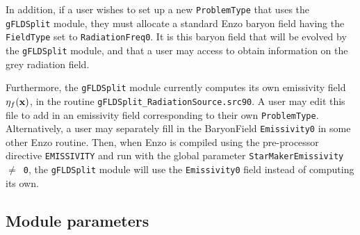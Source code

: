 \documentclass[letterpaper,10pt]{article}
\renewcommand{\(}{\left(}
\renewcommand{\)}{\right)}
\newcommand{\xvec}{{\bf x}}
\begin{document}
In addition, if a user wishes to set up a new {\tt ProblemType} that
uses the {\tt gFLDSplit} module, they must allocate a standard Enzo
baryon field having the {\tt FieldType} set to {\tt RadiationFreq0}.
It is this baryon field that will be evolved by the {\tt gFLDSplit}
module, and that a user may access to obtain information on the
grey radiation field. 

Furthermore, the {\tt gFLDSplit} module currently computes its own
emissivity field $\eta_f(\xvec)$, in the routine 
{\tt gFLDSplit\_RadiationSource.src90}.  A user may edit this file
to add in an emissivity field corresponding to their own 
{\tt ProblemType}.  Alternatively, a user may separately fill in the
BaryonField {\tt Emissivity0} in some other Enzo routine.  Then, when
Enzo is compiled using the pre-processor directive {\tt EMISSIVITY}
and run with the global parameter {\tt StarMakerEmissivity $\ne$ 0},
the {\tt gFLDSplit} module will use the {\tt Emissivity0} field
instead of computing its own. 



\subsection{Module parameters}
\end{document}
